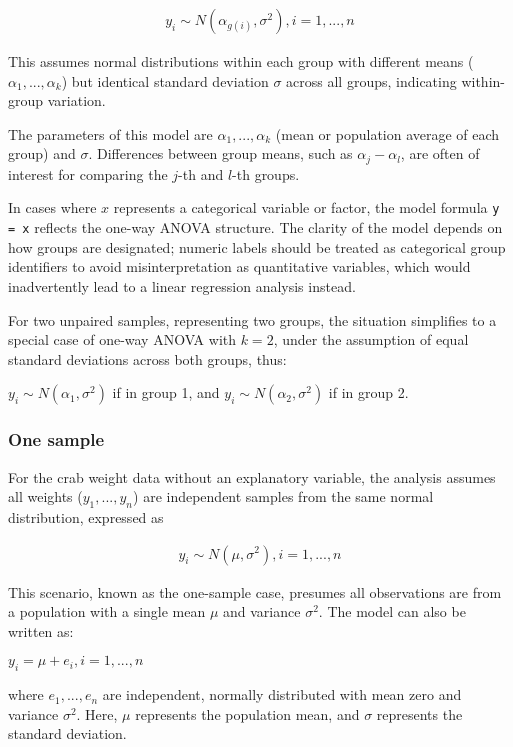 \documentclass{article}
\begin{document}
\begin{align*}
    y_i \sim N(\alpha_{g(i)}, \sigma^2), i=1,...,n
\end{align*}

This assumes normal distributions within each group with different means ($\alpha_1,...,\alpha_k$) but identical standard deviation $\sigma$ across all groups, indicating within-group variation.

The parameters of this model are $\alpha_1,...,\alpha_k$ (mean or population average of each group) and $\sigma$. Differences between group means, such as $\alpha_j - \alpha_l$, are often of interest for comparing the $j$-th and $l$-th groups.

In cases where $x$ represents a categorical variable or factor, the model formula \verb|y = x| reflects the one-way ANOVA structure. The clarity of the model depends on how groups are designated; numeric labels should be treated as categorical group identifiers to avoid misinterpretation as quantitative variables, which would inadvertently lead to a linear regression analysis instead.

For two unpaired samples, representing two groups, the situation simplifies to a special case of one-way ANOVA with $k=2$, under the assumption of equal standard deviations across both groups, thus:

$y_i \sim N(\alpha_1,\sigma^2)$ if in group 1, and $y_i \sim N(\alpha_2, \sigma^2)$ if in group 2.

\subsubsection{One sample}

For the crab weight data without an explanatory variable, the analysis assumes all weights ($y_1,...,y_n$) are independent samples from the same normal distribution, expressed as

\begin{align*}
    y_i \sim N(\mu,\sigma^2), i=1,...,n
\end{align*}

This scenario, known as the one-sample case, presumes all observations are from a population with a single mean $\mu$ and variance $\sigma^2$. The model can also be written as:

$y_i=\mu + e_i, i=1,...,n$

where $e_1,...,e_n$ are independent, normally distributed with mean zero and variance $\sigma^2$. Here, $\mu$ represents the population mean, and $\sigma$ represents the standard deviation.
\end{document}
